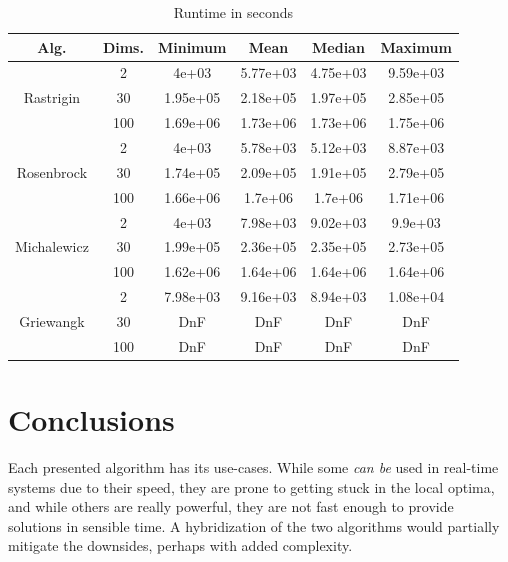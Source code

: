 \documentclass[conference]{IEEEtran}
\begin{document}
\begin{table}[!htbp]
    \caption{Runtime in seconds}
    \centering
    \begin{tabular}{|c c|c c c c|}
        \hline
        Alg. & Dims. & Minimum & Mean & Median & Maximum \\
        \hline
        \multirow{3}{*}{Rastrigin} & 2 & 4e+03 & 5.77e+03 & 4.75e+03 & 9.59e+03 \\
        & 30 & 1.95e+05 & 2.18e+05 & 1.97e+05 & 2.85e+05 \\
        & 100 & 1.69e+06 & 1.73e+06 & 1.73e+06 & 1.75e+06 \\
        \hline
        \multirow{3}{*}{Rosenbrock} & 2 & 4e+03 & 5.78e+03 & 5.12e+03 & 8.87e+03 \\
        & 30 & 1.74e+05 & 2.09e+05 & 1.91e+05 & 2.79e+05 \\
        & 100 & 1.66e+06 & 1.7e+06 & 1.7e+06 & 1.71e+06 \\
        \hline
        \multirow{3}{*}{Michalewicz} & 2 & 4e+03 & 7.98e+03 & 9.02e+03 & 9.9e+03 \\
        & 30 & 1.99e+05 & 2.36e+05 & 2.35e+05 & 2.73e+05 \\
        & 100 & 1.62e+06 & 1.64e+06 & 1.64e+06 & 1.64e+06 \\
        \hline
        \multirow{3}{*}{Griewangk} & 2 & 7.98e+03 & 9.16e+03 & 8.94e+03 & 1.08e+04 \\
        & 30 & DnF & DnF & DnF & DnF \\
        & 100 & DnF & DnF & DnF & DnF \\
        \hline
    \end{tabular}
\end{table}

\pagebreak

\section{Conclusions}
Each presented algorithm has its use-cases. While some \textit{can be} used in real-time systems due to their speed,
they are prone to getting stuck in the local optima, and while others are really powerful, they are not fast enough
to provide solutions in sensible time. A hybridization of the two algorithms would partially mitigate the downsides, perhaps
with added complexity.
\end{document}
